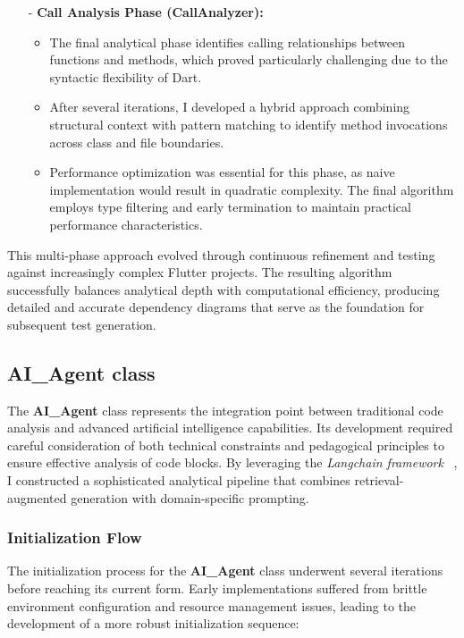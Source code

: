 \begin{itemize}
    \item[-] \textbf{Call Analysis Phase (CallAnalyzer):}
    \begin{itemize}
        \item The final analytical phase identifies calling relationships between functions and methods, which proved particularly challenging due to the syntactic flexibility of Dart.
        \item After several iterations, I developed a hybrid approach combining structural context with pattern matching to identify method invocations across class and file boundaries.
        \item Performance optimization was essential for this phase, as naive implementation would result in quadratic complexity. The final algorithm employs type filtering and early termination to maintain practical performance characteristics.
    \end{itemize}
\end{itemize}

This multi-phase approach evolved through continuous refinement and testing against increasingly complex Flutter projects. The resulting algorithm successfully balances analytical depth with computational efficiency, producing detailed and accurate dependency diagrams that serve as the foundation for subsequent test generation.

\subsection{AI\_Agent class}

The \textbf{AI\_Agent} class represents the integration point between traditional code analysis and advanced artificial intelligence capabilities. Its development required careful consideration of both technical constraints and pedagogical principles to ensure effective analysis of code blocks. By leveraging the \textit{Langchain framework} ~\cite{langchain}, I constructed a sophisticated analytical pipeline that combines retrieval-augmented generation with domain-specific prompting.

\subsubsection{Initialization Flow}

The initialization process for the \textbf{AI\_Agent} class underwent several iterations before reaching its current form. Early implementations suffered from brittle environment configuration and resource management issues, leading to the development of a more robust initialization sequence:

